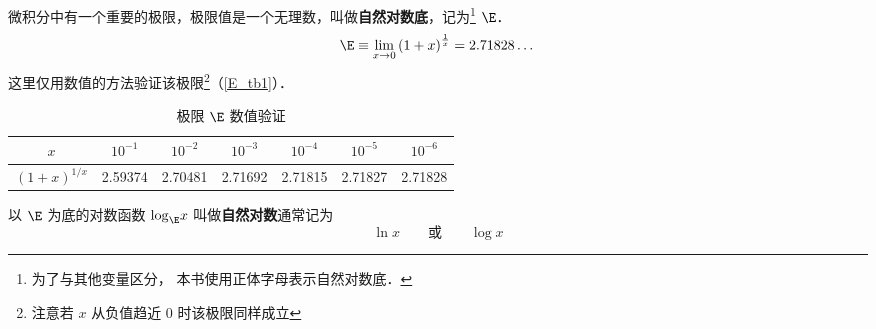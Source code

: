 
微积分中有一个重要的极限，极限值是一个无理数，叫做\textbf{自然对数底}，记为\footnote{为了与其他变量区分， 本书使用正体字母表示自然对数底．} $\E$．
\begin{equation}\label{E_eq1}
\E \equiv \mathop {\lim }\limits_{x \to 0} {\left( {1 + x} \right)^{\frac{1}{x}}} = 2.71828\dots
\end{equation}
这里仅用数值的方法验证该极限\footnote{注意若 $x$ 从负值趋近 $0$ 时该极限同样成立}（\autoref{E_tb1}）．

\begin{table}[ht]
\centering
\caption{极限 $\E$ 数值验证}\label{E_tb1}
\begin{tabular}{|c|c|c|c|c|c|c|}
\hline
$x$ & ${10^{ - 1}}$ & ${10^{ - 2}}$ & ${10^{ - 3}}$ & ${10^{ - 4}}$ & ${10^{ - 5}}$ & ${10^{ - 6}}$ \\
\hline
${\left( {1 + x} \right)^{1/x}}$ & 2.59374 & 2.70481 & 2.71692 & 2.71815 & 2.71827 & 2.71828 \\
\hline
\end{tabular}
\end{table}


以 $\E$ 为底的对数函数 ${\log _{\E}}x$ 叫做\textbf{自然对数}通常记为
\begin{equation}
\ln x \qquad \text{或} \qquad \log x
\end{equation}


